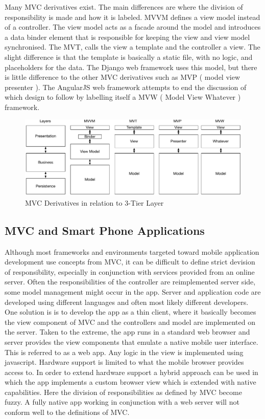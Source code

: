Many MVC derivatives exist. The main differences are where the division of responsibility is made and how it is labeled. MVVM defines a view model instead of a controller. The view model acts as a facade around the model and introduces a data binder element that is responsible for keeping the view and view model synchronised. The MVT, calls the view a template and the controller a view. The slight difference is that the template is basically a static file, with no logic, and placeholders for the data. The Django web framework uses this model, but there is little difference to the other MVC derivatives such as MVP ( model view presenter ). The AngularJS web framework attempts to end the discussion of which design to follow by labelling itself a MVW ( Model View Whatever ) framework\cite{mvw}.


\begin{figure}[H]
    \centering
    \includegraphics[width=\textwidth,keepaspectratio]{assets/concept/mvc_3.pdf}
    \caption{MVC Derivatives in relation to 3-Tier Layer}
    \label{fig:mvc_alt}
\end{figure}

\subsection{MVC and Smart Phone Applications}

Although most frameworks and environments targeted toward mobile application development use concepts from MVC, it can be difficult to define strict devision of responsibility, especially in conjunction with services provided from an online server. Often the responsibilities of the controller are reimplemented server side, some model management might occur in the app. Server and application code are developed using different languages and often most likely different developers. One solution is is to develop the app as a thin client, where it basically becomes the view component of MVC and the controllers and model are implemented on the server. Taken to the extreme, the app runs in a standard web browser and server provides the view components that emulate a native mobile user interface. This is referred to as a web app. Any logic in the view is implemented using javascript. Hardware support is limited to what the mobile browser provides access to. In order to extend hardware support a hybrid approach can be used in which the app implements a custom browser view which is extended with native capabilities. Here the division of responsibilities as defined by MVC become fuzzy. A fully native app working in conjunction with a web server will not conform well to the definitions of MVC.

